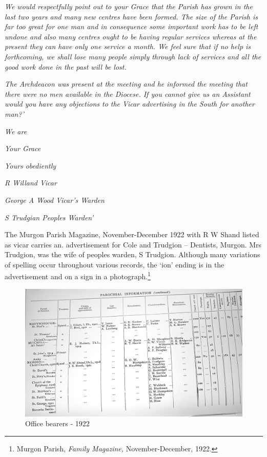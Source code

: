 \emph{We would respectfully point out to your Grace that the Parish has
grown in the last two years and many new centres have been formed. The
size of the Parish is far too great for one man and in consequence some
important work has to be left undone and also many centres ought to be
having regular services whereas at the present they can have only one
service a month. We feel sure that if no help is forthcoming, we shall
lose many people simply through lack of services and all the good work
done in the past will be lost.}

\emph{The Archdeacon was present at the meeting and he informed the
meeting that there were no men available in the Diocese. If you cannot
give us an Assistant would you have any objections to the Vicar
advertising in the South for another man?'}

\emph{We are}

\emph{Your Grace}

\emph{Yours obediently}

\emph{R Willand Vicar}

\emph{George A Wood Vicar's Warden}

\emph{S Trudgian Peoples Warden'}

The Murgon Parish Magazine, November-December 1922 with R W Shand listed
as vicar carries an. advertisement for Cole and Trudgion -- Dentists,
Murgon. Mrs Trudgion, was the wife of peoples warden, S Trudgion.
Although many variations of spelling occur throughout various records,
the `ion' ending is in the advertisement and on a sign in a
photograph.\footnote{Murgon Parish, \emph{Family Magazine,}
  November-December, 1922.}




\begin{figure}[!h]
\begin{center}
\includegraphics[width=.95\textwidth,center]{images/officeBearers1922.jpg}
\caption{ Office bearers - 1922}
\end{center}
\end{figure}


